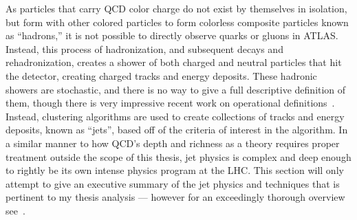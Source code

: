 As particles that carry \gls{QCD} color charge do not exist by themselves in isolation, but form with other colored particles to form colorless composite particles known as ``hadrons,'' it is not possible to directly observe quarks or gluons in ATLAS.
Instead, this process of hadronization, and subsequent decays and rehadronization, creates a shower of both charged and neutral particles that hit the detector, creating charged tracks and energy deposits.
These hadronic showers are stochastic, and there is no way to give a full descriptive definition of them, though there is very impressive recent work on operational definitions~\cite{Metodiev:2018ftz,Komiske:2018vkc,Larkoski:2019nwj}.
Instead, clustering algorithms are used to create collections of tracks and energy deposits, known as ``jets'', based off of the criteria of interest in the algorithm.
In a similar manner to how QCD's depth and richness as a theory requires proper treatment outside the scope of this thesis, jet physics is complex and deep enough to rightly be its own intense physics program at the LHC.
This section will only attempt to give an executive summary of the jet physics and techniques that is pertinent to my thesis analysis --- however for an exceedingly thorough overview see~\cite{Nachman:2016qyc}.

